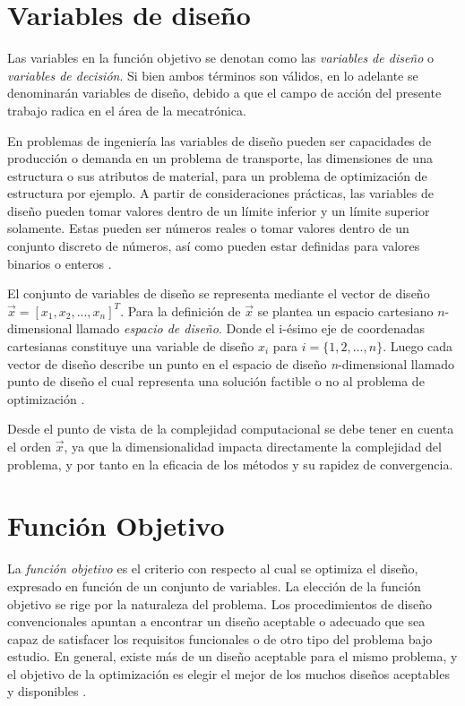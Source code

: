 \section{Variables de diseño}\label{variables}
Las variables en la función objetivo se denotan como las \textit{variables de diseño} o \textit{variables de decisión}. Si bien ambos términos son válidos, en lo adelante se denominarán variables de diseño, debido a que el campo de acción del presente trabajo radica en el área de la mecatrónica.

En problemas de ingeniería las variables de diseño pueden ser capacidades de producción o demanda en un problema de transporte, las dimensiones de una estructura o sus atributos de material, para un problema de optimización de estructura por ejemplo. A partir de consideraciones prácticas, las variables de diseño pueden tomar valores dentro de un límite inferior y un límite superior solamente. Estas pueden ser números reales o tomar valores dentro de un conjunto discreto de números, así como pueden estar definidas para valores binarios o enteros \cite{arora_optimization:_2015}.

El conjunto de variables de diseño se representa mediante  el vector de diseño $\vec{x}=[x_1, x_2, ..., x_n]^T$. Para la definición de $\vec{x}$ se plantea un espacio cartesiano $n$-dimensional llamado \textit{espacio de diseño}. Donde el i-ésimo eje de coordenadas cartesianas constituye una variable de diseño $x_i$ para  $i = \{1,2, ..., n\}$. Luego cada  vector de diseño describe un punto en el espacio de diseño \textit{n}-dimensional llamado punto de diseño  el cual representa una solución factible o no al problema de optimización \cite{rao_engineering_2009}.

Desde el punto de vista de la complejidad computacional se debe tener en cuenta el orden $\vec{x}$, ya que la dimensionalidad impacta directamente la complejidad del problema, y por tanto en la eficacia de los métodos y su rapidez de convergencia.

\section{Función Objetivo}
La \textit{función objetivo} es el criterio con respecto al cual se optimiza el diseño, expresado en función de un conjunto de variables. La elección de la función objetivo se rige por la naturaleza del problema. Los procedimientos de diseño convencionales apuntan a encontrar un diseño aceptable o adecuado que sea capaz de satisfacer los requisitos funcionales o de otro tipo del problema bajo estudio. En general, existe más de un diseño aceptable para el mismo problema, y el objetivo de la optimización es elegir el mejor de los muchos diseños aceptables y disponibles \cite{arora_optimization:_2015}.

